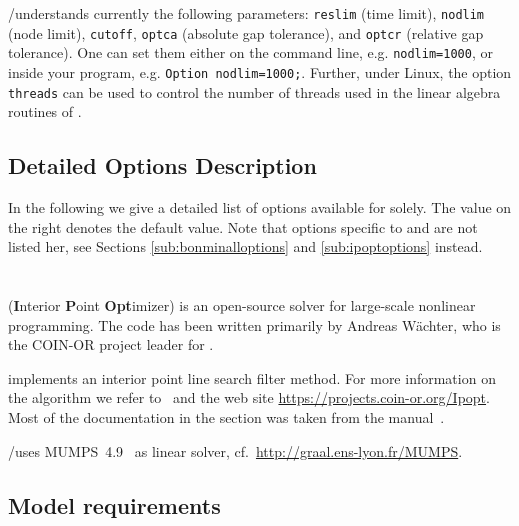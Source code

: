 \GAMS/\COUENNE understands currently the following \GAMS parameters: \texttt{reslim} (time limit), \texttt{nodlim} (node limit), \texttt{cutoff}, \texttt{optca} (absolute gap tolerance), and \texttt{optcr} (relative gap tolerance).
One can set them either on the command line, e.g. \verb+nodlim=1000+, or inside your \GAMS program, e.g. \verb+Option nodlim=1000;+.
Further, under Linux, the option \texttt{threads} can be used to control the number of threads used in the linear algebra routines of \IPOPT.

\subsection{Detailed Options Description}
\label{sub:couenneoptions}

In the following we give a detailed list of options available for \COUENNE solely.
The value on the right denotes the default value.
Note that options specific to \IPOPT and \BONMIN are not listed her, see Sections \ref{sub:bonminalloptions} and \ref{sub:ipoptoptions} instead.



\section{\IPOPT}


\IPOPT (\textbf{I}nterior \textbf{P}oint \textbf{Opt}imizer) is an open-source solver for large-scale nonlinear programming.
The code has been written primarily by Andreas W\"achter, who is the COIN-OR project leader for \IPOPT.

\IPOPT implements an interior point line search filter method.
For more information on the algorithm we refer to~\cite{Waechter2002,WaBi06} and the \IPOPT web site \url{https://projects.coin-or.org/Ipopt}.
Most of the \IPOPT documentation in the section was taken from the \IPOPT manual~\cite{IpoptManual}.

\GAMS/\IPOPT uses \textsc{MUMPS}~4.9~\cite{AmestoyDuffKosterLExcellent2001,AmestoyGuermoucheLExcellentPralet2006} as linear solver, cf.~\url{http://graal.ens-lyon.fr/MUMPS}.

\subsection{Model requirements}

